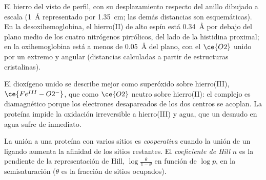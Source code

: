 \begin{omfigure}

{\small El hierro del  visto de perfil, con su desplazamiento respecto del anillo dibujado a
escala (1~\AA{} representado por 1.35~cm; las demás distancias son esquemáticas). En la desoxihemoglobina, el hierro(II) de alto espín está
\qty{0.34}{\angstrom} por debajo del plano medio de los cuatro nitrógenos pirrólicos, del lado de la
histidina proximal; en la oxihemoglobina está a menos de \qty{0.05}{\angstrom} del plano, con el $\ce{O2}$
unido por un extremo y angular (distancias calculadas a partir de estructuras cristalinas).}
\end{omfigure}

El dioxígeno unido se describe mejor como superóxido sobre hierro(III), $\ce{Fe^{III}-O2^-}$, que como
$\ce{O2}$ neutro sobre hierro(II): el complejo es diamagnético porque los electrones
desapareados de los dos centros se acoplan. La proteína impide la oxidación
irreversible a hierro(III) y agua, que un  desnudo en agua sufre de
inmediato.

\begin{definition}\label{def:b3:bioinorganic:cooperativity}
La unión a una proteína con varios sitios es \emph{cooperativa}
cuando la unión de un ligando aumenta la afinidad de los sitios
restantes. El \emph{coeficiente de Hill} $n$ es la pendiente de la
representación de Hill, $\log\frac{\theta}{1 - \theta}$ en función de $\log p$, en la semisaturación ($\theta$ es la fracción de sitios
ocupados).
\end{definition}


